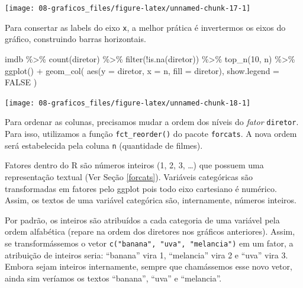 \documentclass[
]{book}
\newenvironment{Shaded}{\begin{snugshade}}{\end{snugshade}}
\newcommand{\AttributeTok}[1]{\textcolor[rgb]{0.77,0.63,0.00}{#1}}
\newcommand{\ConstantTok}[1]{\textcolor[rgb]{0.00,0.00,0.00}{#1}}
\newcommand{\DecValTok}[1]{\textcolor[rgb]{0.00,0.00,0.81}{#1}}
\newcommand{\FunctionTok}[1]{\textcolor[rgb]{0.00,0.00,0.00}{#1}}
\newcommand{\NormalTok}[1]{#1}
\newcommand{\SpecialCharTok}[1]{\textcolor[rgb]{0.00,0.00,0.00}{#1}}
\begin{document}
\begin{center}\texttt{[image: 08-graficos\_files/figure-latex/unnamed-chunk-17-1]} \end{center}

Para consertar as labels do eixo \texttt{x}, a melhor prática é invertermos os eixos do gráfico, construindo barras horizontais.

\begin{Shaded}
\begin{Highlighting}[]
\NormalTok{imdb }\SpecialCharTok{\%\textgreater{}\%} 
  \FunctionTok{count}\NormalTok{(diretor) }\SpecialCharTok{\%\textgreater{}\%}
  \FunctionTok{filter}\NormalTok{(}\SpecialCharTok{!}\FunctionTok{is.na}\NormalTok{(diretor)) }\SpecialCharTok{\%\textgreater{}\%} 
  \FunctionTok{top\_n}\NormalTok{(}\DecValTok{10}\NormalTok{, n) }\SpecialCharTok{\%\textgreater{}\%}
  \FunctionTok{ggplot}\NormalTok{() }\SpecialCharTok{+}
  \FunctionTok{geom\_col}\NormalTok{(}
    \FunctionTok{aes}\NormalTok{(}\AttributeTok{y =}\NormalTok{ diretor, }\AttributeTok{x =}\NormalTok{ n, }\AttributeTok{fill =}\NormalTok{ diretor),}
    \AttributeTok{show.legend =} \ConstantTok{FALSE}
\NormalTok{  )}
\end{Highlighting}
\end{Shaded}

\begin{center}\texttt{[image: 08-graficos\_files/figure-latex/unnamed-chunk-18-1]} \end{center}

Para ordenar as colunas, precisamos mudar a ordem dos níveis do \emph{fator} \texttt{diretor}. Para isso, utilizamos a função \texttt{fct\_reorder()} do pacote \texttt{forcats}. A nova ordem será estabelecida pela coluna \texttt{n} (quantidade de filmes).

Fatores dentro do R são números inteiros (1, 2, 3, \ldots) que possuem uma representação textual (Ver Seção \ref{forcats}). Variáveis categóricas são transformadas em fatores pelo ggplot pois todo eixo cartesiano é numérico. Assim, os textos de uma variável categórica são, internamente, números inteiros.

Por padrão, os inteiros são atribuídos a cada categoria de uma variável pela ordem alfabética (repare na ordem dos diretores nos gráficos anteriores). Assim, se transformássemos o vetor \texttt{c("banana",\ "uva",\ "melancia")} em um fator, a atribuição de inteiros seria: ``banana'' vira 1, ``melancia'' vira 2 e ``uva'' vira 3. Embora sejam inteiros internamente, sempre que chamássemos esse novo vetor, ainda sim veríamos os textos ``banana'', ``uva'' e ``melancia''.
\end{document}
